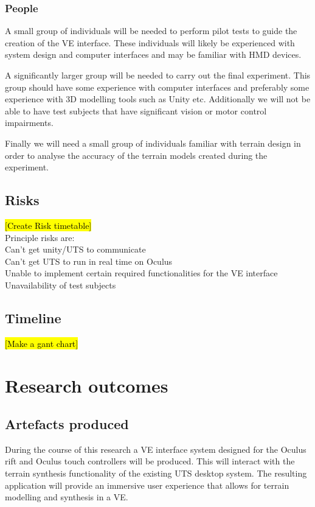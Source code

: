 \documentclass{sig-alternate-05-2015}
\begin{document}
\subsubsection{People}
A small group of individuals will be needed to perform pilot tests to guide the creation of the VE interface. These individuals will likely be experienced with system design and computer interfaces and may be familiar with HMD devices.

A significantly larger group will be needed to carry out the final experiment. This group should have some experience with computer interfaces and preferably some experience with 3D modelling tools such as Unity etc. Additionally we will not be able to have test subjects that have significant vision or motor control impairments.

Finally we will need a small group of individuals familiar with terrain design in order to analyse the accuracy of the terrain models created during the experiment. 
\subsection{Risks}
\hl{[Create Risk timetable]}\\ Principle risks are:\\
Can't get unity/UTS to communicate\\
Can't get UTS to run in real time on Oculus\\
Unable to implement certain required functionalities for the VE interface\\
Unavailability of test subjects
\subsection{Timeline}
\hl{[Make a gant chart]}
\section{Research outcomes}
\subsection{Artefacts produced}
During the course of this research a VE interface system designed for the Oculus rift and Oculus touch controllers will be produced. This will interact with the terrain synthesis functionality of the existing UTS desktop system\cite{Gain2015}. The resulting application will provide an immersive user experience that allows for terrain modelling and synthesis in a VE.
\end{document}
